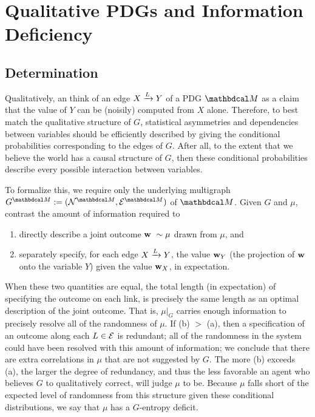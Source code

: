 \documentclass[the-pdg-manual.tex]{subfiles}
\begin{document}
	\section{Qualitative PDGs and Information Deficiency}\label{sec:details-on-joint-scoring}
	\subsection{Determination}

	Qualitatively, an think of an edge $\ed LXY$ of a PDG $\dg M$ as a claim that the value of $Y$ can be (noisily) computed from
	$X$ alone.  
	Therefore, to best match the qualitative structure of $G$, statistical asymmetries and dependencies between variables should
	be efficiently described by giving the conditional probabilities corresponding to the edges of $G$. After all, to the extent that we believe the world has a causal structure of $G$, then these conditional probabilities describe every possible interaction between variables. 

	To formalize this, we require only the underlying multigraph $G^{\dg M} :=
	(\N^{\dg M}, \Ed^{\dg M})$ of $\dg M$. 
	Given $G$ and $\mu$, contrast the amount of
	information required to 
	\begin{enumerate}[label=(\alph*)]
		\item directly describe a joint outcome  $\mathbf w ~ \sim \mu$
		drawn from $\mu$, and 
		\item separately specify, for each edge $\ed LXY$, the value
		$\mathbf w_Y$ (the projection of $\mathbf w$ onto the variable
		$Y$) given the value $\mathbf w_X$, in expectation. 
	\end{enumerate}
	When these two quantities are equal, the total length (in expectation) of specifying the outcome on each link, is precisely the same length as an optimal description of the joint outcome. That is, $\mu|_G$ carries enough information to precisely resolve all of the randomness of $\mu$. If (b) $>$ (a), then a specification of an outcome along each $L \in \mathcal E$ is redundant; all of the randomness in the system could have been resolved with this amount of information; we conclude that there are extra correlations in $\mu$ that are not suggested by $G$. The more (b) exceeds (a), the larger the degree of redundancy, and thus the less favorable an agent who believes $G$ to qualitatively correct, will judge $\mu$ to be. Because $\mu$ falls short of the expected level of randomness from this structure given these conditional distributions, we say that $\mu$ has a $G$-entropy deficit.
\end{document}
